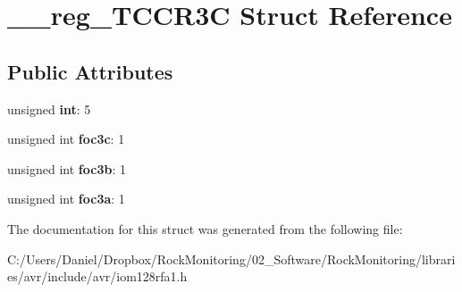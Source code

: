 \hypertarget{struct____reg___t_c_c_r3_c}{}\section{\+\_\+\+\_\+reg\+\_\+\+T\+C\+C\+R3C Struct Reference}
\label{struct____reg___t_c_c_r3_c}
\subsection*{Public Attributes}
\begin{DoxyCompactItemize}
\item 
unsigned {\bfseries int}\+: 5\hypertarget{struct____reg___t_c_c_r3_c_ae808c322b2c11deb0f7134a67424e88e}{}\label{struct____reg___t_c_c_r3_c_ae808c322b2c11deb0f7134a67424e88e}

\item 
unsigned int {\bfseries foc3c}\+: 1\hypertarget{struct____reg___t_c_c_r3_c_a955522ee844e43582ad1cfe48f7d4fdc}{}\label{struct____reg___t_c_c_r3_c_a955522ee844e43582ad1cfe48f7d4fdc}

\item 
unsigned int {\bfseries foc3b}\+: 1\hypertarget{struct____reg___t_c_c_r3_c_af655fdf7691de7f012f20ed1a1deb918}{}\label{struct____reg___t_c_c_r3_c_af655fdf7691de7f012f20ed1a1deb918}

\item 
unsigned int {\bfseries foc3a}\+: 1\hypertarget{struct____reg___t_c_c_r3_c_a3f85032fde4b06ed11948a2aa2bce332}{}\label{struct____reg___t_c_c_r3_c_a3f85032fde4b06ed11948a2aa2bce332}

\end{DoxyCompactItemize}


The documentation for this struct was generated from the following file\+:\begin{DoxyCompactItemize}
\item 
C\+:/\+Users/\+Daniel/\+Dropbox/\+Rock\+Monitoring/02\+\_\+\+Software/\+Rock\+Monitoring/libraries/avr/include/avr/iom128rfa1.\+h\end{DoxyCompactItemize}
